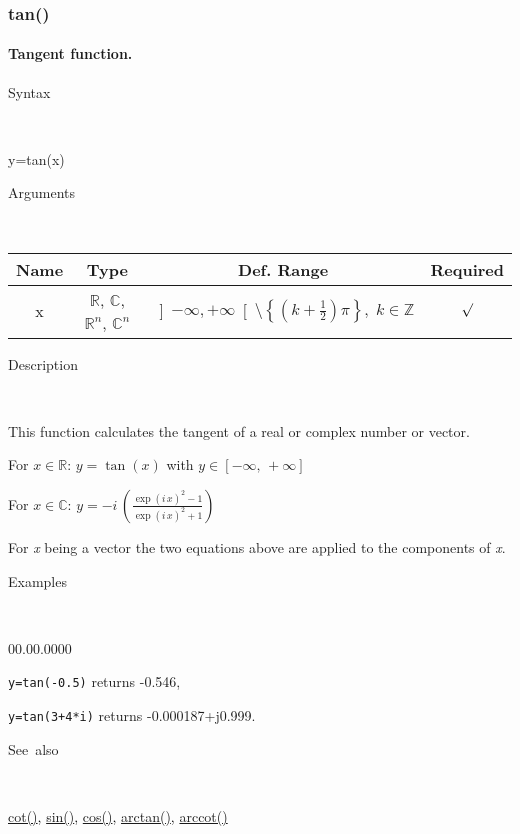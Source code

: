 \subsubsection*{\hypertarget{tan}{}{\Large tan()}}


\paragraph{\label{par:Tangent}Tangent function.}

\begin{description}
\item [Syntax]~
\end{description}
y=tan(x)

\begin{description}
\item [Arguments]~
\end{description}
\begin{tabular}{|c|c|c|c|}
\hline 
Name&
Type&
Def. Range&
Required\tabularnewline
\hline
\hline 
x&
$\mathbb{R}$, $\mathbb{C}$, $\mathbb{R}^{n}$, $\mathbb{C}^{n}$&
$\left]-\infty,+\infty\right[\setminus\left\{ \left(k+\frac{1}{2}\right)\pi\right\} ,\; k\in\mathbb{Z}$&
$\surd$\tabularnewline
\hline
\end{tabular}

\begin{description}
\item [Description]~
\end{description}
This function calculates the tangent of a real or complex number or
vector.

\medskip{}
For $x\in\mathbb{R}$: $y=\tan\left(x\right)$ with $y\in\left[-\infty,\,+\infty\right]$

\medskip{}
For $x\in\mathbb{C}$: $y=-i\,{\displaystyle \left(\frac{\exp\left(i\, x\right)^{2}-1}{\exp\left(i\, x\right)^{2}+1}\right)}$
\medskip{}

For \textit{x} being a vector the two equations above are
applied to the components of \textit{x}.

\begin{description}
\item [Examples]~
\end{description}
\begin{lyxlist}{00.00.0000}
\item [\texttt{y=tan(-0.5)}]returns -0.546,
\item [\texttt{y=tan(3+4{*}i)}]returns -0.000187+j0.999.
\end{lyxlist}
\begin{description}
\item [See~also]~
\end{description}
\textcolor{blue}{\hyperlink{cot}{cot()}}\textcolor{black}{,} \textcolor{blue}{\hyperlink{sin}{sin()}}\textcolor{black}{,}
\textcolor{blue}{\hyperlink{cos}{cos()}}\textcolor{black}{,} \textcolor{blue}{\hyperlink{arctan}{arctan()}}\textcolor{black}{,}
\textcolor{blue}{\hyperlink{arccot}{arccot()}}


